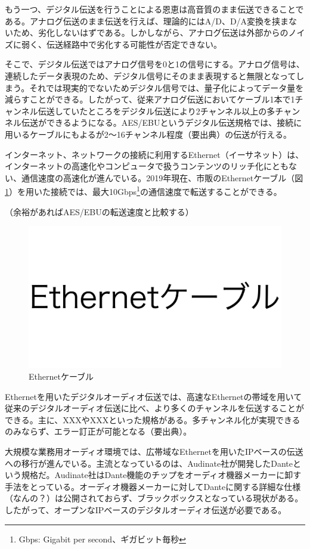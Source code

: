 もう一つ、デジタル伝送を行うことによる恩恵は高音質のまま伝送できることである。アナログ伝送のまま伝送を行えば、理論的にはA/D、D/A変換を挟まないため、劣化しないはずである。しかしながら、アナログ伝送は外部からのノイズに弱く、伝送経路中で劣化する可能性が否定できない。

そこで、デジタル伝送ではアナログ信号を0と1の信号にする。アナログ信号は、連続したデータ表現のため、デジタル信号にそのまま表現すると無限となってしまう。それでは現実的でないためデジタル信号では、量子化によってデータ量を減らすことができる\cite{analog-io}。したがって、従来アナログ伝送においてケーブル1本で1チャンネル伝送していたところをデジタル伝送により2チャンネル以上の多チャンネル伝送ができるようになる。AES/EBUというデジタル伝送規格では、接続に用いるケーブルにもよるが2〜16チャンネル程度（要出典）の伝送が行える。

インターネット、ネットワークの接続に利用するEthernet（イーサネット）は、インターネットの高速化やコンピュータで扱うコンテンツのリッチ化にともない、通信速度の高速化が進んでいる。2019年現在、市販のEthernetケーブル（図\ref{fig:ethernet_cable}）を用いた接続では、最大10Gbps\footnote{Gbps: Gigabit per second、ギガビット毎秒}の通信速度で転送することができる。

（余裕があればAES/EBUの転送速度と比較する）

\begin{figure}[htbp]
  \centering
  \label{fig:ethernet_cable}
  \includegraphics[width=0.4\linewidth]{img/ethernet_cable.pdf}
  \caption{Ethernetケーブル}
\end{figure}

Ethernetを用いたデジタルオーディオ伝送では、高速なEthernetの帯域を用いて従来のデジタルオーディオ伝送に比べ、より多くのチャンネルを伝送することができる。主に、XXXやXXXといった規格がある。多チャンネル化が実現できるのみならず、エラー訂正が可能となる（要出典）。

大規模な業務用オーディオ環境では、広帯域なEthernetを用いたIPベースの伝送への移行が進んでいる。主流となっているのは、Audinate社が開発したDanteという規格だ。Audinate社はDante機能のチップをオーディオ機器メーカーに卸す手法をとっている。オーディオ機器メーカーに対してDanteに関する詳細な仕様（なんの？）は公開されておらず、ブラックボックスとなっている現状がある。したがって、オープンなIPベースのデジタルオーディオ伝送が必要である。

